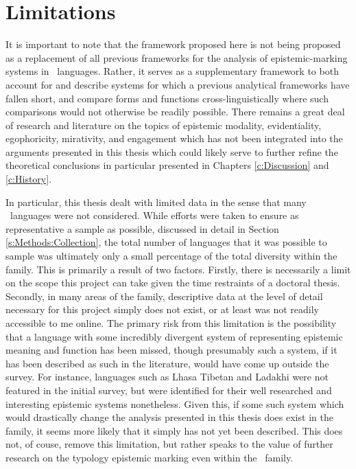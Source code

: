 \section{Limitations}
It is important to note that the framework proposed here is not being proposed as a replacement of all previous frameworks for the analysis of epistemic-marking systems in \lfam\ languages. Rather, it serves as a supplementary framework to both account for and describe systems for which a previous analytical frameworks have fallen short, and compare forms and functions cross-linguistically where such comparisons would not otherwise be readily possible. There remains a great deal of research and literature on the topics of epistemic modality, evidentiality, egophoricity, mirativity, and engagement which has not been integrated into the arguments presented in this thesis which could likely serve to further refine the theoretical conclusions in particular presented in Chapters \ref{c:Discussion} and \ref{c:History}.

In particular, this thesis dealt with limited data in the sense that many \lfam\ languages were not considered. While efforts were taken to ensure as representative a sample as possible, discussed in detail in Section \ref{s:Methods:Collection}, the total number of languages that it was possible to sample was ultimately only a small percentage of the total diversity within the family. This is primarily a result of two factors. Firstly, there is necessarily a limit on the scope this project can take given the time restraints of a doctoral thesis. Secondly, in many areas of the family, descriptive data at the level of detail necessary for this project simply does not exist, or at least was not readily accessible to me online. The primary risk from this limitation is the possibility that a language with some incredibly divergent system of representing epistemic meaning and function has been missed, though presumably such a system, if it has been described as such in the literature, would have come up outside the survey. For instance, languages such as Lhasa Tibetan and Ladakhi were not featured in the initial survey, but were identified for their well researched and interesting epistemic systems nonetheless. Given this, if some such system which would drastically change the analysis presented in this thesis does exist in the family, it seems more likely that it simply has not yet been described. This does not, of couse, remove this limitation, but rather speaks to the value of further research on the typology epistemic marking even within the \lfam\ family.

